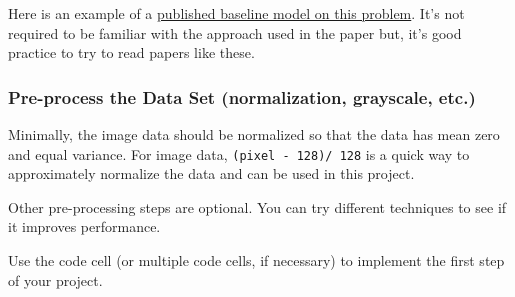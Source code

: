 \documentclass[11pt]{article}
\begin{document}
Here is an example of a
\href{http://yann.lecun.com/exdb/publis/pdf/sermanet-ijcnn-11.pdf}{published
baseline model on this problem}. It's not required to be familiar with
the approach used in the paper but, it's good practice to try to read
papers like these.

    \subsubsection{Pre-process the Data Set (normalization, grayscale,
etc.)}\label{pre-process-the-data-set-normalization-grayscale-etc.}

    Minimally, the image data should be normalized so that the data has mean
zero and equal variance. For image data, \texttt{(pixel\ -\ 128)/\ 128}
is a quick way to approximately normalize the data and can be used in
this project.

Other pre-processing steps are optional. You can try different
techniques to see if it improves performance.

Use the code cell (or multiple code cells, if necessary) to implement
the first step of your project.
\end{document}
